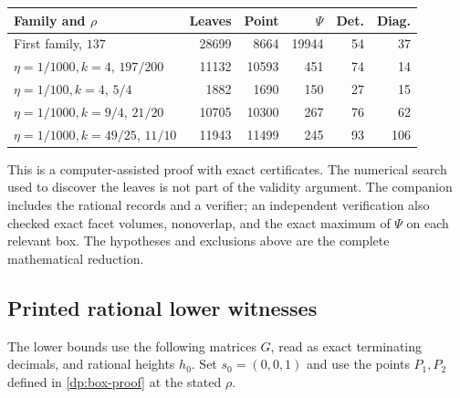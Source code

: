 \begin{center}
\begin{tabular}{@{}lrrrrr@{}}\toprule
 Family and $\rho$ & Leaves & Point & $\Psi$ & Det. & Diag.\\\midrule
 First family, $137$ & 28699 & 8664 & 19944 & 54 & 37\\
 $\eta=1/1000,k=4$, $197/200$ & 11132 & 10593 & 451 & 74 & 14\\
 $\eta=1/100,k=4$, $5/4$ & 1882 & 1690 & 150 & 27 & 15\\
 $\eta=1/1000,k=9/4$, $21/20$ & 10705 & 10300 & 267 & 76 & 62\\
 $\eta=1/1000,k=49/25$, $11/10$ & 11943 & 11499 & 245 & 93 & 106\\\bottomrule
\end{tabular}
\end{center}
This is a computer-assisted proof with exact certificates. The numerical
search used to discover the leaves is not part of the validity argument.
The companion includes the rational records and a verifier; an independent
verification also checked exact facet volumes, nonoverlap, and the exact
maximum of $\Psi$ on each relevant box. The hypotheses and exclusions above
are the complete mathematical reduction.

\subsection{Printed rational lower witnesses}\label{dp:lower-witnesses}

The lower bounds use the following matrices $G$, read as exact terminating
decimals, and rational heights $h_0$. Set $s_0=(0,0,1)$ and use the points
$P_1,P_2$ defined in \cref{dp:box-proof} at the stated $\rho$.

